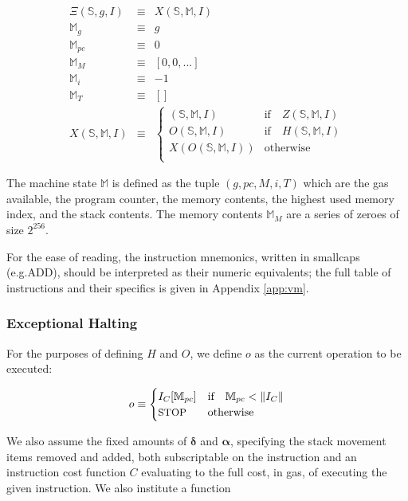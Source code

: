 \documentclass[9pt,oneside]{amsart}
\makeatletter
\newcommand*\eg{e.g.\@\xspace}
\makeatother
\begin{document}
\begin{multicols}{2}
\begin{eqnarray}
\Xi(\mathbb{S}, g, I) & \equiv & X(\mathbb{S}, \mathbb{M}, I) \\
\mathbb{M}_g & \equiv & g \\
\mathbb{M}_{pc} & \equiv & 0 \\
\mathbb{M}_M & \equiv & [0, 0, ...] \\
\mathbb{M}_i & \equiv & -1 \\
\mathbb{M}_T & \equiv & [] \\
X(\mathbb{S}, \mathbb{M}, I) & \equiv & \begin{cases}
(\mathbb{S}, \mathbb{M}, I) & \text{if} \quad Z(\mathbb{S}, \mathbb{M}, I)\\
O(\mathbb{S}, \mathbb{M}, I) & \text{if} \quad H(\mathbb{S}, \mathbb{M}, I)\\
X(O(\mathbb{S}, \mathbb{M}, I)) & \text{otherwise}\\
\end{cases}
\end{eqnarray}

The machine state $\mathbb{M}$ is defined as the tuple $(g, pc, M, i, T)$ which are the gas available, the program counter, the memory contents, the highest used memory index, and the stack contents. The memory contents $\mathbb{M}_M$ are a series of zeroes of size $2^{256}$.

For the ease of reading, the instruction mnemonics, written in smallcaps (\eg {\small ADD}), should be interpreted as their numeric equivalents; the full table of instructions and their specifics is given in Appendix \ref{app:vm}.

\subsubsection{Exceptional Halting}

For the purposes of defining $H$ and $O$, we define $o$ as the current operation to be executed:

\begin{equation}
o \equiv \begin{cases} I_C[\mathbb{M}_{pc}] & \text{if} \quad \mathbb{M}_{pc} < \lVert I_C \rVert \\
\text{\small STOP} & \text{otherwise}
\end{cases}
\end{equation}

We also assume the fixed amounts of $\mathbf{\delta}$ and $\mathbf{\alpha}$, specifying the stack movement items removed and added, both subscriptable on the instruction and an instruction cost function $C$ evaluating to the full cost, in gas, of executing the given instruction. We also institute a function


\end{multicols}
\end{document}
